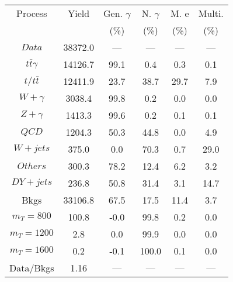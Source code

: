 \begin{figure}
\begin{minipage}[c]{0.32\textwidth}
{\begin{tabular}{cccccc}
\hline
Process & Yield & Gen. $\gamma$ & N. $\gamma$ & M. e & Multi. \\
 &  & (\%) & (\%) & (\%) & (\%)  \\
\hline
                                                                      $ Data $ &  38372.0 &  --- &  --- &  --- &  ---\\
$ t\bar{t}\gamma $ &  14126.7 &  99.1 &  0.4 &  0.3 &  0.1\\
$ t/t\bar{t} $ &  12411.9 &  23.7 &  38.7 &  29.7 &  7.9\\
$ W+\gamma $ &  3038.4 &  99.8 &  0.2 &  0.0 &  0.0\\
$ Z+\gamma $ &  1413.3 &  99.6 &  0.2 &  0.1 &  0.1\\
$ QCD $ &  1204.3 &  50.3 &  44.8 &  0.0 &  4.9\\
$ W+jets $ &  375.0 &  0.0 &  70.3 &  0.7 &  29.0\\
$ Others $ &  300.3 &  78.2 &  12.4 &  6.2 &  3.2\\
$ DY+jets $ &  236.8 &  50.8 &  31.4 &  3.1 &  14.7\\
Bkgs &  33106.8 &  67.5 &  17.5 &  11.4 &  3.7\\
$ m_{T} = 800 $ &  100.8 &  -0.0 &  99.8 &  0.2 &  0.0\\
$ m_{T} = 1200 $ &  2.8 &  0.0 &  99.9 &  0.0 &  0.0\\
$ m_{T} = 1600 $ &  0.2 &  -0.1 &  100.0 &  0.1 &  0.0\\
Data/Bkgs &  1.16 &  --- &  --- &  --- &  ---\\
\hline
\end{tabular}
}
\end{minipage}
\end{figure}


